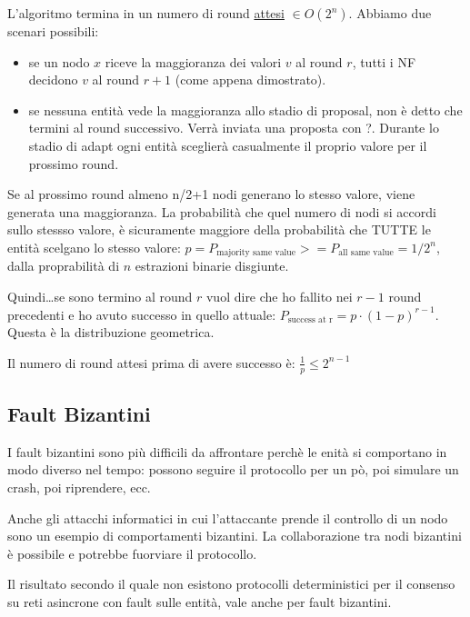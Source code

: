 L'algoritmo termina in un numero di round \underline{attesi} $\in O(2^n)$.
Abbiamo due scenari possibili:
\begin{itemize}
 \item se un nodo $x$ riceve la maggioranza dei valori $v$ al round $r$, tutti i NF decidono $v$ al round $r+1$ (come appena dimostrato).
 \item se nessuna entità vede la maggioranza allo stadio di proposal, non è detto che termini al round successivo. Verrà inviata una proposta con ?.
 Durante lo stadio di adapt ogni entità sceglierà casualmente il proprio valore per il prossimo round.
\end{itemize}

Se al prossimo round almeno n/2+1 nodi generano lo stesso valore, viene generata una maggioranza.
La probabilità che quel numero di nodi si accordi sullo stessso valore, è sicuramente maggiore della probabilità che TUTTE le entità
scelgano lo stesso valore: $p = P_\text{majority same value} >= P_\text{all same value} = 1/2^n$, dalla proprabilità di $n$ estrazioni binarie disgiunte.

Quindi\dots se sono termino al round $r$ vuol dire che ho fallito nei $r-1$ round precedenti e ho avuto successo in quello attuale:
$P_\text{success at r} = p \cdot (1-p)^{r-1}$. Questa è la distribuzione geometrica.

Il numero di round attesi prima di avere successo è: $\frac{1}{p} \leq 2^{n-1}$

\subsection{Fault Bizantini}
I fault bizantini sono più difficili da affrontare perchè le enità si comportano in modo diverso nel tempo: possono seguire il protocollo per un pò,
poi simulare un crash, poi riprendere, ecc.

Anche gli attacchi informatici in cui l'attaccante prende il controllo di un nodo sono un esempio di comportamenti bizantini.
La collaborazione tra nodi bizantini è possibile e potrebbe fuorviare il protocollo.

Il risultato secondo il quale non esistono protocolli deterministici per il consenso su reti asincrone con fault sulle entità, vale
anche per fault bizantini.


